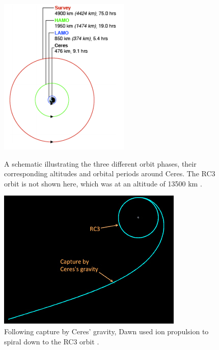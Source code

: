 \begin{figure}[h]
\begin{minipage}[t]{0.45\linewidth}
\centering
\includegraphics[width=\textwidth]{ceresorbits.png}
\caption{A schematic illustrating the three different orbit phases, their corresponding altitudes and orbital periods around Ceres. The \gls{RC3} orbit is not shown here, which was at an altitude of 13500 km \cite{ceresorbits}.}
\label{fig:ceresorbits}
\end{minipage}
\hspace{0.5cm}
\begin{minipage}[t]{0.45\linewidth}
\centering
\includegraphics[width=\textwidth]{rc3.png}
\caption{Following capture by Ceres' gravity, Dawn used ion propulsion to spiral down to the \gls{RC3} orbit  \cite{dawnblog}.}
\label{fig:rc3}
\end{minipage}
\end{figure}

